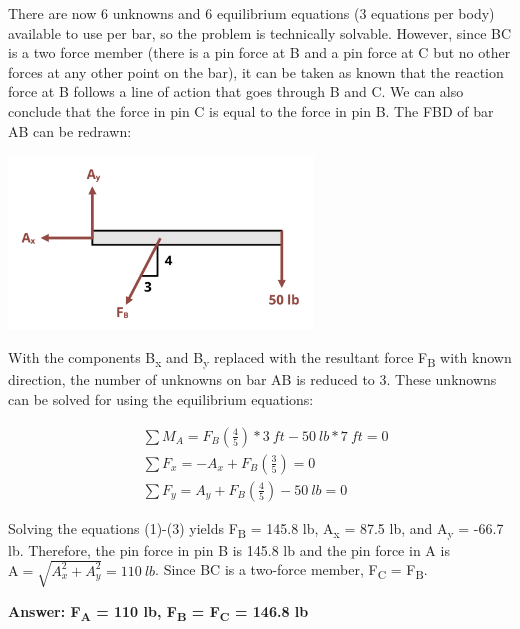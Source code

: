 \documentclass[
  letterpaper,
  DIV=11,
  numbers=noendperiod]{scrreprt}
\theoremstyle{definition}
\theoremstyle{remark}
\begin{document}
\begin{tcolorbox}
\begin{tcolorbox}
There are now 6 unknowns and 6 equilibrium equations (3 equations per
body) available to use per bar, so the problem is technically solvable.
However, since BC is a two force member (there is a pin force at B and a
pin force at C but no other forces at any other point on the bar), it
can be taken as known that the reaction force at B follows a line of
action that goes through B and C. We can also conclude that the force in
pin C is equal to the force in pin B. The FBD of bar AB can be redrawn:

\begin{center}
\includegraphics[width=3.1875in,height=\textheight]{images/CH1 PNGs/example 1.3 part 3.png}
\end{center}

With the components B\textsubscript{x} and B\textsubscript{y} replaced
with the resultant force F\textsubscript{B} with known direction, the
number of unknowns on bar AB is reduced to 3. These unknowns can be
solved for using the equilibrium equations:

\[
\begin{aligned}
& \sum M_A=F_B\left(\frac{4}{5}\right)*3{~ft}-50{~lb}*7{~ft}=0 \\
& \sum F_x=-A_x+F_B\left(\frac{3}{5}\right)=0 \\
& \sum F_y=A_y+F_B\left(\frac{4}{5}\right)-50{~lb}=0
\end{aligned}
\]

Solving the equations (1)-(3) yields F\textsubscript{B} = 145.8 lb,
A\textsubscript{x} = 87.5 lb, and A\textsubscript{y} = -66.7 lb.
Therefore, the pin force in pin B is 145.8 lb and the pin force in A is
\(\mathrm{A}=\sqrt{A_x^2+A_y^2}=110{~lb}\). Since BC is a two-force
member, F\textsubscript{C} = F\textsubscript{B}.

\textbf{Answer: F\textsubscript{A} = 110 lb, F\textsubscript{B} =
F\textsubscript{C} = 146.8 lb}

\end{tcolorbox}

\end{tcolorbox}
\end{document}
